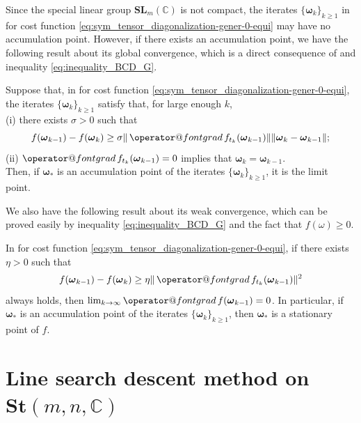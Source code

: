 \documentclass[final,onefignum,onetabnum]{siamart190516}
\makeatletter
\newcommand{\matr}[1]{\boldsymbol{#1}}
\newcommand{\ProjGrad}[2]{\mathop{{\operator@font grad} }#1(#2)}
\newcommand{\CC}{\mathbb{C}}
\newcommand{\SL}{\mathbf{SL}}
\newcommand{\St}{\mathbf{St}}
\makeatother
\begin{document}
Since the special linear group $\SL_{m}(\CC)$ is not compact, the iterates $\{\matr{\omega}_{k}\}_{k\ge1}$ in  for cost function \cref{eq:sym_tensor_diagonalization-gener-0-equi} may have no accumulation point.
However, if there exists an accumulation point, we have the following result about its global convergence,
which is a direct consequence of  and inequality \cref{eq:inequality_BCD_G}. 

\begin{lemma}\label{theorem-SU15-2}
Suppose that, in  for cost function \cref{eq:sym_tensor_diagonalization-gener-0-equi}, the iterates $\{\matr{\omega}_k\}_{k\geq 1}$ satisfy that, for large enough $k$,\\
(i) there exists $\sigma>0$ such that
\begin{equation}\label{eq:sufficient_descent-2}
f(\matr{\omega}_{k-1})-f(\matr{\omega}_{k})\geq\sigma\|\ProjGrad{f_{t_k}}{\matr{\omega}_{k-1}}\|\|\matr{\omega}_{k}-\matr{\omega}_{k-1}\|;
\end{equation}
(ii) $\ProjGrad{f_{t_k}}{\matr{\omega}_{k-1}}=0$ implies that $\matr{\omega}_{k}=\matr{\omega}_{k-1}$.\\
Then, if $\matr{\omega}_*$ is an accumulation point of the iterates $\{\matr{\omega}_k\}_{k\geq 1}$, it is the limit point.
\end{lemma}

We also have the following result about its weak convergence,
which can be proved easily by inequality \cref{eq:inequality_BCD_G} and the fact that $f(\omega)\geq 0$. 

\begin{lemma}\label{theorem-weak-general_c}
In  for cost function \cref{eq:sym_tensor_diagonalization-gener-0-equi}, 
if there exists $\eta>0$ such that
\begin{equation}\label{equation-condition-weak_c}
f(\matr{\omega}_{k-1})-f(\matr{\omega}_{k})\geq\eta\|\ProjGrad{f_{t_k}}{\matr{\omega}_{k-1}}\|^2
\end{equation}
always holds, then $\lim_{k\rightarrow\infty}\ProjGrad{f}{\matr{\omega}_{k-1}}=0$.
In particular, if $\matr{\omega}_*$ is an accumulation point of the iterates $\{\matr{\omega}_{k}\}_{k\ge1}$,
then $\matr{\omega}_*$ is a stationary point of $f$.
\end{lemma}


\section{Line search descent method on $\St(m,n,\CC)$}\label{subsec:first_block_algo}
\end{document}
